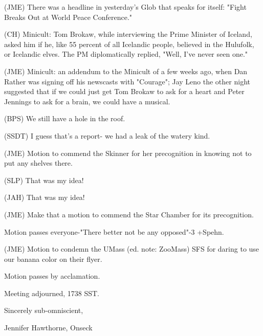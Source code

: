 \documentclass[12pt]{article}
\begin{document}
(JME) There was a headline in yesterday's Glob that speaks for itself: "Fight Breaks Out at World Peace Conference."

(CH) Minicult: Tom Brokaw, while interviewing the Prime Minister of Iceland, asked him if he, like 55 percent of all Icelandic people, believed in the Hulufolk, or Icelandic elves. The PM diplomatically replied, "Well, I've never seen one."

(JME) Minicult: an addendum to the Minicult of a few weeks ago, when Dan Rather was signing off his newscasts with "Courage"; Jay Leno the other night suggested that if we could just get Tom Brokaw to ask for a heart and Peter Jennings to ask for a brain, we could have a musical.

(BPS) We still have a hole in the roof.

(SSDT) I guess that's a report- we had a leak of the watery kind.

(JME) Motion to commend the Skinner for her precognition in knowing not to put any shelves there.

(SLP) That was my idea!

(JAH) That was my idea!

(JME) Make that a motion to commend the Star Chamber for its precognition.

Motion passes everyone-"There better not be any opposed"-3 +Spehn.

(JME) Motion to condemn the UMass (ed. note: ZooMass) SFS for daring to use our banana color on their flyer.

Motion passes by acclamation.

\vspace{12pt}

\noindent
Meeting adjourned, 1738 SST.

\vspace{18pt}

\centerline{Sincerely sub-omniscient,}
\centerline{Jennifer Hawthorne, Onseck}
\end{document}
